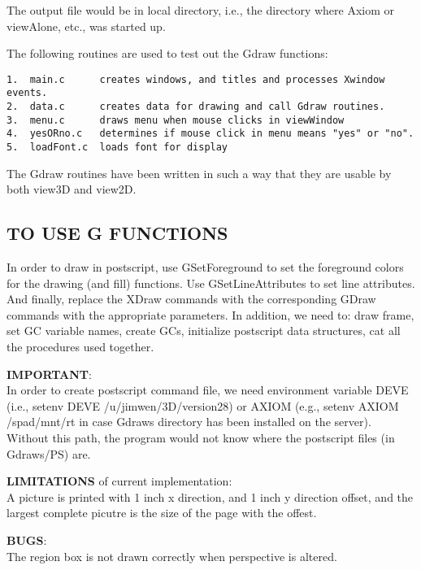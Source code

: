 \documentclass{article}
\begin{document}
The output file would be in local directory, i.e., the directory where Axiom
or viewAlone, etc., was started up.

The following routines are used to test out the Gdraw functions:
\begin{verbatim}
1.  main.c      creates windows, and titles and processes Xwindow events.
2.  data.c      creates data for drawing and call Gdraw routines.
3.  menu.c      draws menu when mouse clicks in viewWindow
4.  yesORno.c   determines if mouse click in menu means "yes" or "no".
5.  loadFont.c 	loads font for display
\end{verbatim}

The Gdraw routines have been written in such a way that they are usable by
both view3D and view2D.  

\subsection{TO USE G FUNCTIONS}

In order to draw in postscript, use GSetForeground to set the foreground 
colors for the drawing (and fill) functions.  Use GSetLineAttributes
to set line attributes.  And finally, replace the XDraw commands with the
corresponding GDraw commands with the appropriate parameters.  In addition,
we need to: draw frame, set GC variable names, create GCs, initialize
postscript data structures, cat all the procedures used together.

{\bf IMPORTANT}:\\
In order to create postscript command file, we need environment
variable DEVE (i.e., setenv DEVE /u/jimwen/3D/version28) or AXIOM (e.g., setenv
AXIOM /spad/mnt/rt in case Gdraws directory has been installed on the server).
Without this path, the program would not know where the postscript files (in
Gdraws/PS) are.

{\bf LIMITATIONS} of current implementation:\\
A picture is printed with 1 inch x direction, and 1 inch y direction 
offset, and the largest complete picutre is the size of the page
with the offest.

{\bf BUGS}:\\
The region box is not drawn correctly when perspective is altered.
\end{document}
